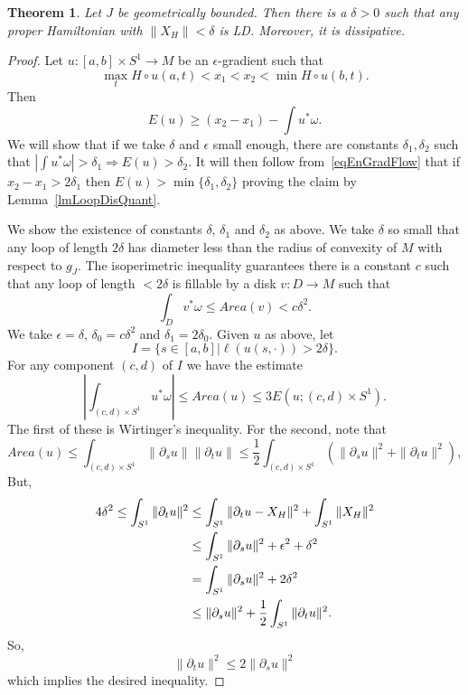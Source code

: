 \documentclass[11pt]{amsart}
\newtheorem{tm}{Theorem}[section]
\theoremstyle{definition}
\theoremstyle{remark}
\begin{document}
\begin{tm}\label{tmBoundGradDis}
Let $J$ be geometrically bounded. Then there is a $\delta>0$ such that any proper Hamiltonian with $\|X_H\|<\delta$ is LD. Moreover, it is dissipative.
\end{tm}
\begin{proof}
Let $u:[a,b]\times S^1\to M$ be an $\epsilon$-gradient such that
\[
\max_tH\circ u(a,t)<x_1<x_2<\min H\circ u(b,t).
\]
 Then
\begin{equation}\label{eqEnGradFlow}
E(u)\geq (x_2-x_1)-\int u^*\omega.
\end{equation}
We will show that if we take $\delta$ and $\epsilon$ small enough, there are constants $\delta_1,\delta_2$ such that $\left|\int u^*\omega\right|>\delta_1\Rightarrow E(u)>\delta_2$. It will then follow from~\eqref{eqEnGradFlow} that if $x_2-x_1>2\delta_1$ then $E(u)>\min\{\delta_1,\delta_2\}$ proving the claim by Lemma~\ref{lmLoopDisQuant}.

We show the existence of constants $\delta$, $\delta_1$ and $\delta_2$ as above. We take $\delta$ so small that any loop of length $2\delta$ has diameter less than the radius of convexity of $M$ with respect to $g_J$. The isoperimetric inequality guarantees there is a constant $c$ such that any loop of length $<2\delta$ is fillable by a disk $v:D\to M$ such that
\[
\int_Dv^*\omega\leq Area(v)<c\delta^2.
\]
We take $\epsilon=\delta$, $\delta_0=c\delta^2$ and $\delta_1=2\delta_0$. Given $u$ as above, let
\[
I=\{s\in[a,b]|\ell( u(s,\cdot))>2\delta\}.
\]
For any component $(c,d)$ of $I$ we have the estimate
\[
\left|\int_{(c,d)\times S^1}u^*\omega\right|\leq Area(u)\leq 3 E(u;{(c,d)\times S^1}).
\]
The first of these is Wirtinger's inequality. For the second, note that
\[
Area(u)\leq\int_{(c,d)\times S^1}\|\partial_su\|\|\partial_tu\|\leq \frac12\int_{(c,d)\times S^1}(\|\partial_su\|^2+\|\partial_tu\|^2),
\]
But,
\begin{align}
4\delta^2\leq\int_{S^1}\|\partial_tu\|^2&\leq \int_{S^1}\|\partial_tu-X_H\|^2+\int_{S^1}\|X_H\|^2\notag\\
&\leq \int_{S^1}\|\partial_su\|^2+\epsilon^2 +\delta^2\notag\\
&=\int_{S^1}\|\partial_su\|^2+2\delta^2\notag\\
&\leq \|\partial_su\|^2+\frac12\int_{S^1}\|\partial_tu\|^2\notag.
\end{align}
So,
\[
\|\partial_tu\|^2\leq2\|\partial_su\|^2
\]
which implies the desired inequality.


\end{proof}
\end{document}

